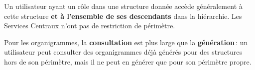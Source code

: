 \medskip
Un utilisateur ayant un r\^ole dans une structure donn\'ee acc\`ede g\'en\'eralement \`a cette structure \textbf{et \`a l'ensemble de ses descendants} dans la hi\'erarchie. Les Services Centraux n'ont pas de restriction de p\'erim\`etre.

\begin{tipbox}
  Pour les organigrammes, la \textbf{consultation} est plus large que la \textbf{g\'en\'eration}\,: un utilisateur peut consulter des organigrammes d\'ej\`a g\'en\'er\'es pour des structures hors de son p\'erim\`etre, mais il ne peut en g\'en\'erer que pour son p\'erim\`etre propre.
\end{tipbox}
